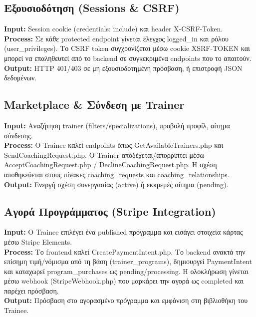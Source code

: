 \documentclass[12pt,a4paper]{report}
\begin{document}
\subsection{Εξουσιοδότηση (Sessions \& CSRF)}
\textbf{Input:} Session cookie (\textenglish{credentials: include}) και header \textenglish{X-CSRF-Token}. \\
\textbf{Process:} Σε κάθε protected endpoint γίνεται έλεγχος \textenglish{logged\_in} και ρόλου (\textenglish{user\_privileges}). Το CSRF token συγχρονίζεται μέσω cookie \textenglish{XSRF-TOKEN} και μπορεί να επαληθευτεί από το backend σε συγκεκριμένα endpoints που το απαιτούν. \\
\textbf{Output:} \textenglish{HTTP 401/403} σε μη εξουσιοδοτημένη πρόσβαση, ή επιστροφή JSON δεδομένων.

\subsection{Marketplace \& Σύνδεση με Trainer}
\textbf{Input:} Αναζήτηση trainer (filters/specializations), προβολή προφίλ, αίτημα σύνδεσης. \\
\textbf{Process:} Ο Trainee καλεί endpoints όπως \textenglish{GetAvailableTrainers.php} και \textenglish{SendCoachingRequest.php}. Ο Trainer αποδέχεται/απορρίπτει μέσω \textenglish{AcceptCoachingRequest.php / DeclineCoachingRequest.php}. Η σχέση αποθηκεύεται στους πίνακες \textenglish{coaching\_requests} και \textenglish{coaching\_relationships}. \\
\textbf{Output:} Ενεργή σχέση συνεργασίας (\textenglish{active}) ή εκκρεμές αίτημα (\textenglish{pending}).

\subsection{Αγορά Προγράμματος (Stripe Integration)}
\textbf{Input:} Ο Trainee επιλέγει ένα published πρόγραμμα και εισάγει στοιχεία κάρτας μέσω \textenglish{Stripe Elements}. \\
\textbf{Process:} Το frontend καλεί \textenglish{CreatePaymentIntent.php}. Το backend ανακτά την επίσημη τιμή/νόμισμα από τη βάση (\textenglish{trainer\_programs}), δημιουργεί \textenglish{PaymentIntent} και καταχωρεί \textenglish{program\_purchases} ως \textenglish{pending/processing}. Η ολοκλήρωση γίνεται μέσω webhook (\textenglish{StripeWebhook.php}) που μαρκάρει την αγορά ως \textenglish{completed} και παρέχει πρόσβαση. \\
\textbf{Output:} Πρόσβαση στο αγορασμένο πρόγραμμα και εμφάνιση στη βιβλιοθήκη του Trainee.
\end{document}
